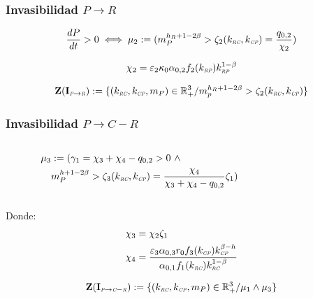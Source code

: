 \documentclass[11 pt,t]{beamer}
\newcommand{\PP}{\textit{\tiny P}}
\newcommand{\CC}{\textit{\tiny C}}
\newcommand{\R}{\textit{\tiny R}}
\newcommand{\CP}{\textit{\tiny CP}}
\newcommand{\RC}{\textit{\tiny RC}}
\newcommand{\RP}{\textit{\tiny RP}}
\begin{document}
\begin{frame}
  \frametitle{Invasibilidad $P \to R$}
  \begin{equation}
    \frac{dP}{dt} >0 \iff \mu_2 := ( m_P^{h_R + 1 - 2\beta} > \zeta_2(k_{\RC},k_{\CP}) = \frac{q_{0,2}}{\chi_2} )
  \end{equation}

  \begin{equation}
    \begin{aligned}
      \chi_2 &= \varepsilon_2 \kappa_0\alpha_{0,2} f_2(k_{\RP})k_{\RP}^{1-\beta} \\
    \end{aligned}
  \end{equation}

  \begin{equation}
    \mathbf{Z(I_{\PP \to \R})} := \{ (k_{\RC},k_{\CP},m_P) \in \mathbb{R}^3_+ / m_p^{h_R + 1 - 2\beta} > \zeta_2(k_{\RC},k_{\CP}) \}
  \end{equation}

\end{frame}
\begin{frame}
  \frametitle{Invasibilidad $P \to C-R$}
  \begin{columns}
    \begin{column}{0.7\textwidth}
    \begin{equation*}
      \begin{aligned}
      \mu_3 &:= (\gamma_1 = \chi_3 + \chi_4 - q_{0,2} >0 \ \land \\ &m_P^{h + 1 - 2\beta} > \zeta_3(k_{\RC},k_{\CP}) = \frac{\chi_4}{\chi_3 + \chi_4 - q_{0,2}}\zeta_1)
    \end{aligned}
  \end{equation*}
  \end{column}
  
  \begin{column}{0.3\textwidth}
    \begin{center}
      \resizebox{0.3\textwidth}{!}{}
      \end{center}
  \end{column}
  \end{columns}
Donde:
\begin{equation}\label{eq:3rdCond}
  \begin{aligned}
    \chi_3 &= \chi_2 \zeta_1 \\
    \chi_4 &= \frac{\varepsilon_3 \alpha_{0,3}r_0 f_3(k_{\CP})k_{\CP}^{\beta - h}}{\alpha_{0,1}f_1(k_{\RC})k_{\RC}^{1-\beta}}
  \end{aligned}
\end{equation}

\begin{equation}
    \mathbf{Z(I_{\PP \to \CC-\R})} := \{ (k_{\RC},k_{\CP},m_P) \in \mathbb{R}^3_+ / \mu_1 \land \mu_3 \}
  \end{equation}


\end{frame}
\end{document}
